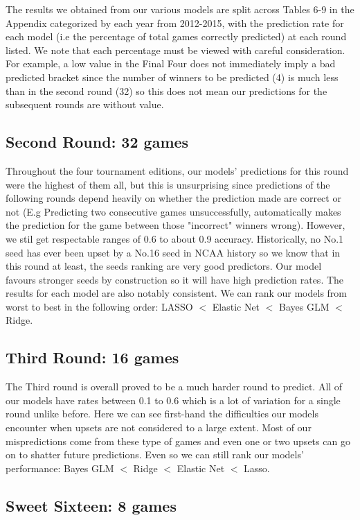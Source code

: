 \documentclass{article} %
\begin{document}
The results we obtained from our various models are split across Tables 6-9 in the Appendix categorized by each year from 2012-2015, with the prediction rate for each model (i.e the percentage of total games correctly predicted) at each round listed. We note that each percentage must be viewed with careful consideration. For example, a low value in the Final Four does not immediately imply a bad predicted bracket since the number of winners to be predicted (4) is much less than in the second round (32) so this does not mean our predictions for the subsequent rounds are without value.

\subsection{Second Round: 32 games}

Throughout the four tournament editions, our models' predictions for this round were the highest of them all, but this is unsurprising since predictions of the following rounds depend heavily on whether the prediction made are correct or not (E.g Predicting two consecutive games unsuccessfully, automatically makes the prediction for the game between those "incorrect" winners wrong). However, we stil get respectable ranges of 0.6 to about 0.9 accuracy. Historically, no No.1 seed has ever been upset by a No.16 seed in NCAA history so we know that in this round at least, the seeds ranking are very good predictors. Our model favours stronger seeds by construction so it will have high prediction rates. The results for each model are also notably consistent. We can rank our models from worst to best in the following order: LASSO $<$ Elastic Net $<$ Bayes GLM $<$ Ridge.

\subsection{Third Round: 16 games}

The Third round is overall proved to be a much harder round to predict. All of our models have rates between 0.1 to 0.6 which is a lot of variation for a single round unlike before. Here we can see first-hand the difficulties our models encounter when upsets are not considered to a large extent. Most of our mispredictions come from these type of games and even one or two upsets can go on to shatter future predictions. Even so we can still rank our models' performance: Bayes GLM $<$ Ridge $<$ Elastic Net $<$ Lasso.

\subsection{Sweet Sixteen: 8 games}
\end{document}
